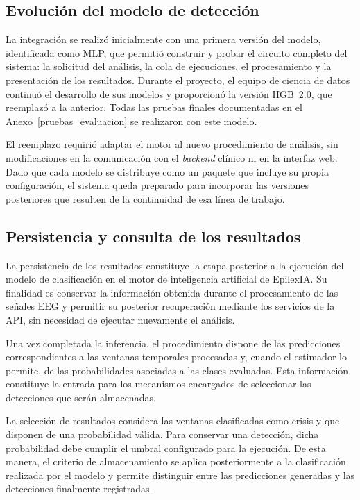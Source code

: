 \subsection{Evolución del modelo de detección}
\label{subsec:evolucion-modelo}

La integración se realizó inicialmente con una primera versión del modelo, identificada como MLP, que permitió construir y probar el circuito completo del sistema: la solicitud del análisis, la cola de ejecuciones, el procesamiento y la presentación de los resultados.
Durante el proyecto, el equipo de ciencia de datos continuó el desarrollo de sus modelos y proporcionó la versión HGB~2.0, que reemplazó a la anterior.
Todas las pruebas finales documentadas en el Anexo~\ref{pruebas_evaluacion} se realizaron con este modelo.

El reemplazo requirió adaptar el motor al nuevo procedimiento de análisis, sin modificaciones en la comunicación con el \textit{backend} clínico ni en la interfaz web.
Dado que cada modelo se distribuye como un paquete que incluye su propia configuración, el sistema queda preparado para incorporar las versiones posteriores que resulten de la continuidad de esa línea de trabajo.

\subsection{Persistencia y consulta de los resultados}

La persistencia de los resultados constituye la etapa posterior a la
ejecución del modelo de clasificación en el motor de inteligencia
artificial de EpilexIA. Su finalidad es conservar la información
obtenida durante el procesamiento de las señales EEG y permitir
su posterior recuperación mediante los servicios de la API,
sin necesidad de ejecutar nuevamente el análisis.

Una vez completada la inferencia, el procedimiento dispone de
las predicciones correspondientes a las ventanas temporales
procesadas y, cuando el estimador lo permite, de las probabilidades
asociadas a las clases evaluadas. Esta información constituye
la entrada para los mecanismos encargados de seleccionar
las detecciones que serán almacenadas.

La selección de resultados considera las ventanas clasificadas
como crisis y que disponen de una probabilidad válida. Para
conservar una detección, dicha probabilidad debe cumplir el
umbral configurado para la ejecución. De esta manera, el
criterio de almacenamiento se aplica posteriormente a la
clasificación realizada por el modelo y permite distinguir
entre las predicciones generadas y las detecciones finalmente
registradas.

